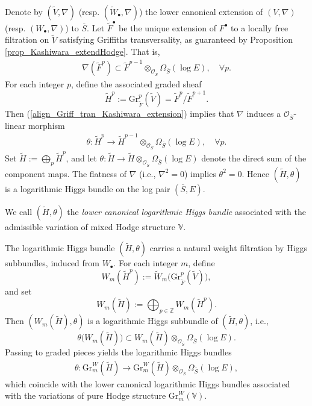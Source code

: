 \documentclass[11pt,letterpaper]{amsart}
\numberwithin{equation}{section}
\begin{document}
Denote by $(\widetilde{V}, \nabla)$ (resp. $(\widetilde{W}_\bullet, \nabla)$) the lower canonical extension of $(V, \nabla)$ (resp. $(W_\bullet, \nabla)$) to $\overline{S}$. Let $\widetilde{F}^\bullet$ be the unique extension of $F^\bullet$ to a locally free filtration on $\widetilde{V}$ satisfying Griffiths transversality, as guaranteed by Proposition \ref{prop_Kashiwara_extendHodge}. That is,  
\begin{align}\label{align_Griff_tran_Kashiwara_extension}  
	\nabla(\widetilde{F}^p) \subset \widetilde{F}^{p-1} \otimes_{\mathcal{O}_{\overline{S}}} \Omega_{\overline{S}}(\log E), \quad \forall p.
\end{align}  
For each integer $p$, define the associated graded sheaf  
\[
\widetilde{H}^p := \mathrm{Gr}_{\widetilde{F}}^p(\widetilde{V}) = \widetilde{F}^p / \widetilde{F}^{p+1}.
\]  
Then (\ref{align_Griff_tran_Kashiwara_extension}) implies that $\nabla$ induces a $\mathcal{O}_{\overline{S}}$-linear morphism  
\begin{align*}
	\theta: \widetilde{H}^p \to \widetilde{H}^{p-1} \otimes_{\mathcal{O}_{\overline{S}}} \Omega_{\overline{S}}(\log E), \quad \forall p.
\end{align*}  
Set $\widetilde{H} := \bigoplus_p \widetilde{H}^p$, and let $\theta: \widetilde{H} \to \widetilde{H} \otimes_{\mathcal{O}_{\overline{S}}} \Omega_{\overline{S}}(\log E)$ denote the direct sum of the component maps. The flatness of $\nabla$ (i.e., $\nabla^2 = 0$) implies $\theta^2 = 0$. Hence $(\widetilde{H}, \theta)$ is a logarithmic Higgs bundle on the log pair $(\overline{S}, E)$.  
\begin{defn}\label{defn_LHB_ass_VHSBM}  
	We call $(\widetilde{H}, \theta)$ the \emph{lower canonical logarithmic Higgs bundle} associated with the admissible variation of mixed Hodge structure $\mathbb{V}$.  
\end{defn}  
The logarithmic Higgs bundle $(\widetilde{H}, \theta)$ carries a natural weight filtration by Higgs subbundles, induced from $W_\bullet$. For each integer $m$, define  
\[
W_m(\widetilde{H}^p) := \widetilde{W}_m\big(\mathrm{Gr}_{\widetilde{F}}^p(\widetilde{V})\big),
\]  
and set  
\[
W_m(\widetilde{H}) := \bigoplus_{p \in \mathbb{Z}} W_m(\widetilde{H}^p).
\]  
Then $(W_m(\widetilde{H}), \theta)$ is a logarithmic Higgs subbundle of $(\widetilde{H}, \theta)$, i.e.,  
\[
\theta\big(W_m(\widetilde{H})\big) \subset W_m(\widetilde{H}) \otimes_{\mathcal{O}_{\overline{S}}} \Omega_{\overline{S}}(\log E).
\]  
Passing to graded pieces yields the logarithmic Higgs bundles  
\begin{align}\label{eq_grW_Higgs}  
	\theta: \mathrm{Gr}^W_m(\widetilde{H}) \to \mathrm{Gr}^W_m(\widetilde{H}) \otimes_{\mathcal{O}_{\overline{S}}} \Omega_{\overline{S}}(\log E),
\end{align}  
which coincide with the lower canonical logarithmic Higgs bundles associated with the variations of pure Hodge structure $\mathrm{Gr}^W_m(\mathbb{V})$.
\end{document}
